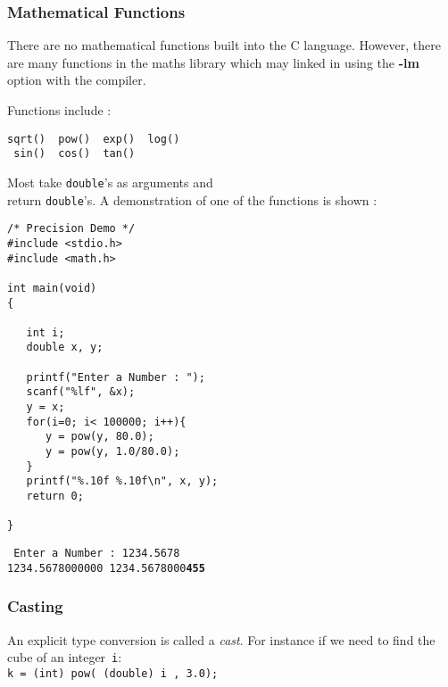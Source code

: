 
\begin{frame}[fragile]
\frametitle{Mathematical Functions}

There are no mathematical functions built into the C language.
However, there are many functions in the maths library
which may linked in using the \textbf{-lm} option with the compiler.

Functions include :
\begin{verbatim}
sqrt()  pow()  exp()  log()
 sin()  cos()  tan()
\end{verbatim}
Most take {\tt double}'s as arguments and\\ return {\tt double}'s.
A demonstration of one of the functions is shown :
\begin{verbatim}
/* Precision Demo */
#include <stdio.h>
#include <math.h>

int main(void)
{

   int i;
   double x, y;

   printf("Enter a Number : ");
   scanf("%lf", &x);
   y = x;
   for(i=0; i< 100000; i++){
      y = pow(y, 80.0);
      y = pow(y, 1.0/80.0);
   }
   printf("%.10f %.10f\n", x, y);
   return 0;

}
\end{verbatim}
{\tt
Enter a Number : 1234.5678\\
1234.5678000000 1234.5678000{\bf 455}
}
\end{frame}


\begin{frame}[fragile]
\frametitle{Casting}

An explicit type conversion is called a {\it cast}.
For instance if we need to find the cube of an integer~\verb^i^:\\
\verb^k = (int) pow( (double) i , 3.0);^

\end{frame}
